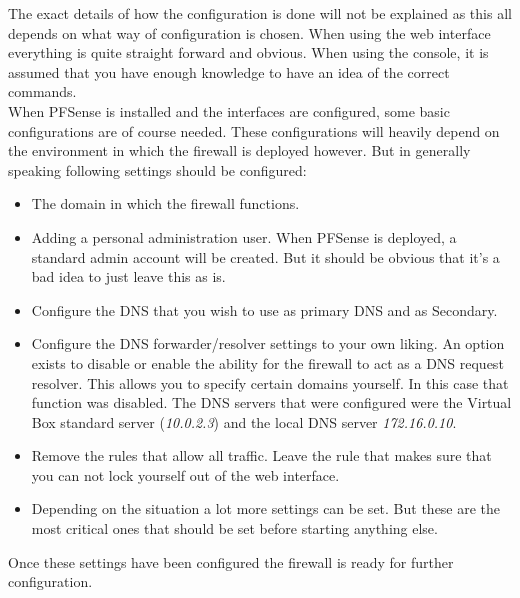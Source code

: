   The exact details of how the configuration is done will not be explained as this all depends on what way of configuration is chosen. When using the web interface everything is quite straight forward and obvious. When using the console, it is assumed that you have enough knowledge to have an idea of the correct commands.\\
When PFSense is installed and the interfaces are configured, some basic configurations are of course needed. These configurations will heavily depend on the environment in which the firewall is deployed however. But in generally speaking following settings should be configured:
\begin{itemize}
\item The domain in which the firewall functions.
\item Adding a personal administration user. When PFSense is deployed, a standard admin account will be created. But it should be obvious that it's a bad idea to just leave this as is. 
\item Configure the DNS that you wish to use as primary DNS and as Secondary. 
\item Configure the DNS forwarder/resolver settings to your own liking. An option exists to disable or enable the ability for the firewall to act as a DNS request resolver. This allows you to specify certain domains yourself. In this case that function was disabled. The DNS servers that were configured were the Virtual Box standard server (\textit{10.0.2.3}) and the local DNS server \textit{172.16.0.10}.
\item Remove the rules that allow all traffic. Leave the rule that makes sure that you can not lock yourself out of the web interface.
\item Depending on the situation a lot more settings can be set. But these are the most critical ones that should be set before starting anything else.
\end{itemize} 

Once these settings have been configured the firewall is ready for further configuration.
